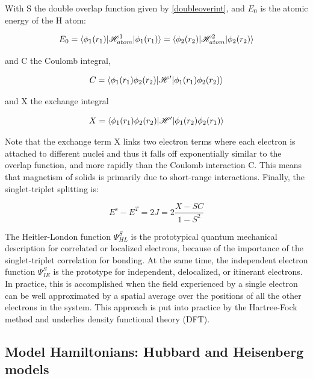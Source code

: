 With S the double overlap function given by \ref{doubleoverint}, and $E_0$ is the atomic energy of the H atom:

\begin{equation}
E_0=\braket{\phi_1(r_1)|\mathscr{H}^1_{atom}|\phi_1(r_1)}= \braket{\phi_2(r_2)|\mathscr{H}_{atom}^2|\phi_2(r_2)}
\label{HLenTrip}
\end{equation}

and C the Coulomb integral,

\begin{equation}
C=\braket{\phi_1(r_1)\phi_2(r_2)|\mathscr{H}'|\phi_1(r_1)\phi_2(r_2)}
\end{equation}

and X the exchange integral

\begin{equation}
X = \braket{\phi_1(r_1)\phi_2(r_2)|\mathscr{H}'|\phi_1(r_2)\phi_2(r_1)}
\end{equation}

Note that the exchange term X links two electron terms where each electron is attached to different nuclei and thus it falls off exponentially similar to the overlap function, and more rapidly than the Coulomb interaction C. This means that magnetism of solids is primarily due to short-range interactions. Finally, the singlet-triplet splitting is:

\begin{equation}
E^s-E^T=2J=2\frac{X-SC}{1-S^2}
\end{equation}

The Heitler-London function $\Psi_{HL}^S$ is the prototypical quantum mechanical description for correlated or localized electrons, because of the importance of the singlet-triplet correlation for bonding. At the same time, the independent electron function $\Psi_{IE}^S$ is the prototype for independent, delocalized, or itinerant electrons. In practice, this is accomplished when the field experienced by a single electron can be well approximated by a spatial average over the positions of all the other electrons in the system. This approach is put into practice by the Hartree-Fock method and underlies density functional theory (DFT).

\subsection{Model Hamiltonians: Hubbard and Heisenberg models}

